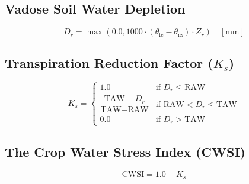 \documentclass[11pt,a4paper]{article}
\theoremstyle{definition}
\theoremstyle{remark}
\begin{document}
\subsection{Vadose Soil Water Depletion}
\begin{equation}
    D_r = \max\left(0.0, 1000 \cdot (\theta_{\text{fc}} - \theta_{\text{rz}}) \cdot Z_r\right) \quad [\text{mm}]
\end{equation}

\subsection{Transpiration Reduction Factor ($K_s$)}
\begin{equation}
    \label{eq:ks_formula}
    K_s = \begin{cases} 
    1.0 & \text{if } D_r \le \text{RAW} \\ 
    \dfrac{\text{TAW} - D_r}{\text{TAW} - \text{RAW}} & \text{if } \text{RAW} < D_r \le \text{TAW} \\ 
    0.0 & \text{if } D_r > \text{TAW} 
    \end{cases}
\end{equation}

\subsection{The Crop Water Stress Index (CWSI)}
\begin{equation}
    \text{CWSI} = 1.0 - K_s
\end{equation}
\end{document}
